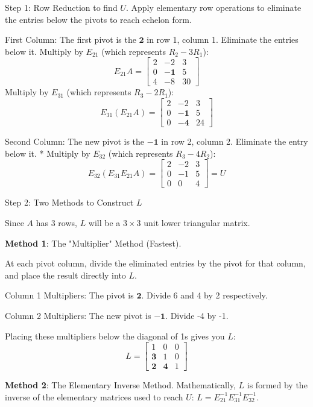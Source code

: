 \documentclass[../linear-algebra.tex]{subfiles}
\begin{document}
\noindent Step 1: Row Reduction to find $U$.
Apply elementary row operations to eliminate the entries below the pivots to reach echelon form. 

\noindent First Column: The first pivot is the $\mathbf{2}$ in row 1, column 1. Eliminate the entries below it.
Multiply by $E_{21}$ (which represents $R_2 - 3R_1$):
\[
E_{21}A = \begin{bmatrix} 2 & -2 & 3 \\ 0 & \mathbf{-1} & 5 \\ 4 & -8 & 30 \end{bmatrix}
\]
Multiply by $E_{31}$ (which represents $R_3 - 2R_1$):
\[
E_{31}(E_{21}A) = \begin{bmatrix} 2 & -2 & 3 \\ 0 & \mathbf{-1} & 5 \\ 0 & \mathbf{-4} & 24 \end{bmatrix}
\]

\noindent Second Column: The new pivot is the $\mathbf{-1}$ in row 2, column 2. Eliminate the entry below it.
    * Multiply by $E_{32}$ (which represents $R_3 - 4R_2$):
\[
E_{32}(E_{31}E_{21}A) = \begin{bmatrix} 2 & -2 & 3 \\ 0 & -1 & 5 \\ 0 & 0 & 4 \end{bmatrix} = U
\]

\noindent Step 2: Two Methods to Construct $L$

\noindent Since $A$ has 3 rows, $L$ will be a $3 \times 3$ unit lower triangular matrix. 

\noindent\textbf{Method 1}: The "Multiplier" Method (Fastest).

\noindent At each pivot column, divide the eliminated entries by the pivot for that column, and place the result directly into $L$. 

\noindent Column 1 Multipliers: The pivot is $\mathbf{2}$. Divide 6 and 4 by 2 respectively.

\noindent Column 2 Multipliers: The new pivot is $\mathbf{-1}$. Divide -4 by -1.

\noindent Placing these multipliers below the diagonal of 1s gives you $L$:
\[
L = \begin{bmatrix} 1 & 0 & 0 \\ \mathbf{3} & 1 & 0 \\ \mathbf{2} & \mathbf{4} & 1 \end{bmatrix}
\]

\noindent\textbf{Method 2}: The Elementary Inverse Method.
Mathematically, $L$ is formed by the inverse of the elementary matrices used to reach $U$: $L = E_{21}^{-1}E_{31}^{-1}E_{32}^{-1}$.
\end{document}
